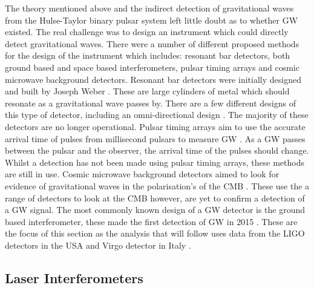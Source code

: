 The theory mentioned above and the indirect detection of gravitational waves from the Hulse-Taylor binary pulsar system left little doubt as to whether \ac{GW} existed. 
The real challenge was to design an instrument which could directly detect gravitational waves.
There were a number of different proposed methods for the design of the instrument which includes: resonant bar detectors, both ground based and space based interferometers, pulsar timing arrays and cosmic microwave background detectors. 
Resonant bar detectors were initially designed and built by Joseph Weber \citep{weber1966ObservationThermal}. 
These are large cylinders of metal which should resonate as a gravitational wave passes by. 
There are a few different designs of this type of detector, including an omni-directional design \citep{dewaard2003MiniGRAILFirst}. 
The majority of these detectors are no longer operational.
Pulsar timing arrays aim to use the accurate arrival time of pulses from millisecond pulsars to measure \ac{GW} \citep{hobbs2017GravitationalWave}. As a \ac{GW} passes between the pulsar and the observer, the arrival time of the pulses should change. 
Whilst a detection has not been made using pulsar timing arrays, these methods are still in use.
Cosmic microwave background detectors aimed to look for evidence of gravitational waves in the polarisation's of the CMB \citep{ade2018ConstraintsPrimordial}.  
These use the a range of detectors to look at the CMB however, are yet to confirm a detection of a \ac{GW} signal.
The most commonly known design of a \ac{GW} detector is the ground based interferometer, these made the first detection of \ac{GW} in 2015 \citep{abbott2016ObservationGravitational}. 
These are the focus of this section as the analysis that will follow uses data from the \ac{LIGO} detectors in the USA \citep{abbott2009LIGOLaser,aasi2015AdvancedLIGO} and Virgo detector in Italy \citep{acernese2015AdvancedVirgo,acernese2008StatusVirgo}. 

\subsection{Laser Interferometers}

